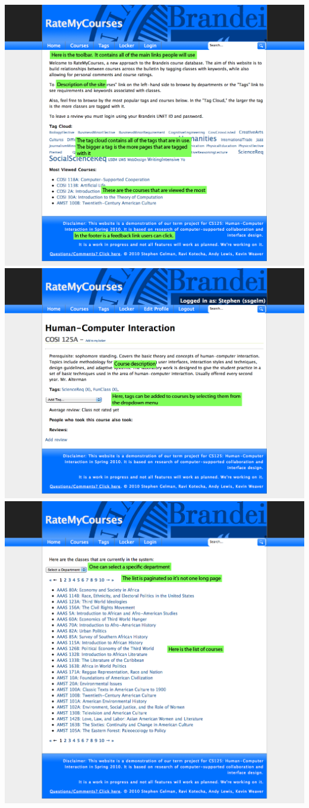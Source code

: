 \documentclass[12pt]{report}
\begin{document}
\includegraphics[width=\textwidth]{screen-1.png}
\includegraphics[width=\textwidth]{screen-2.png}
\includegraphics[width=\textwidth]{screen-3.png}
\end{document}
